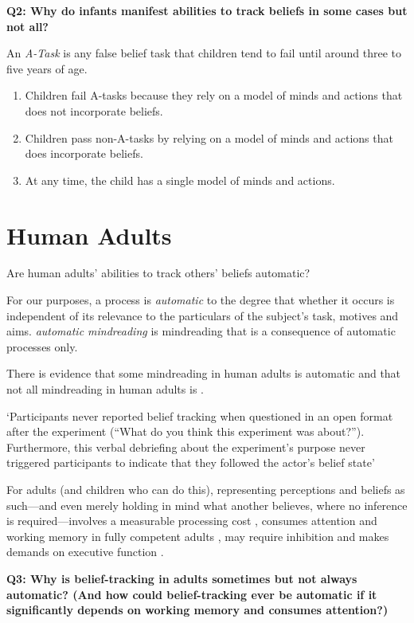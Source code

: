 \documentclass[12pt]{extarticle}
\begin{document}
\begin{multicols*}{3}
\textbf{Q2: Why do infants manifest abilities to track beliefs in some cases but not all?}

An \emph{A-Task} is any false belief task that children tend to fail until around
three to five years of age.

\begin{enumerate}
\item Children fail A-tasks
because they rely on a model of minds and actions that does not incorporate beliefs.
\item Children pass non-A-tasks
by relying on a model of minds and actions that does incorporate beliefs.
\item At any time, the child has a single model of minds and actions.
\end{enumerate}



\section{Human Adults}

Are human adults’ abilities to track others’ beliefs automatic?

For our purposes, a process is \emph{automatic} to the degree that whether it occurs is independent of
its relevance to the particulars of the subject's task, motives and aims.  \emph{automatic mindreading} is mindreading that is a consequence of
automatic processes only.


There is evidence that some mindreading in human adults is
 automatic
\citep[e.g.][]{kovacs_social_2010,Schneider:2011fk,Wel:2013uq} and
that not all mindreading in human adults is
\citep{apperly:2008_back,apperly_why_2010,Wel:2013uq}.

‘Participants never reported belief tracking when questioned in an open format after the experiment
(“What do you think this experiment was about?”). Furthermore, this verbal debriefing about the
experiment’s purpose never triggered participants to indicate that they followed the actor’s belief
state’ \citep[p.~2]{Schneider:2011fk}


For adults (and children who can do this),
representing perceptions and beliefs as such---and even merely holding in mind
what another believes, where no inference is required---involves a measurable
processing cost \citep{apperly:2008_back,apperly:2010_limits}, consumes attention
and working memory in fully competent adults \citealp{Apperly:2009cc,
lin:2010_reflexively, McKinnon:2007rr},  may require inhibition \citep{bull:2008_role}
and makes demands on executive function \citep{apperly:2004_frontal,samson:2005_seeing}.

\textbf{Q3: Why is belief-tracking in adults sometimes but not always automatic?
(And how could belief-tracking ever be automatic if it significantly depends on working memory and consumes attention?)}



\footnotesize


\end{multicols*}
\end{document}
